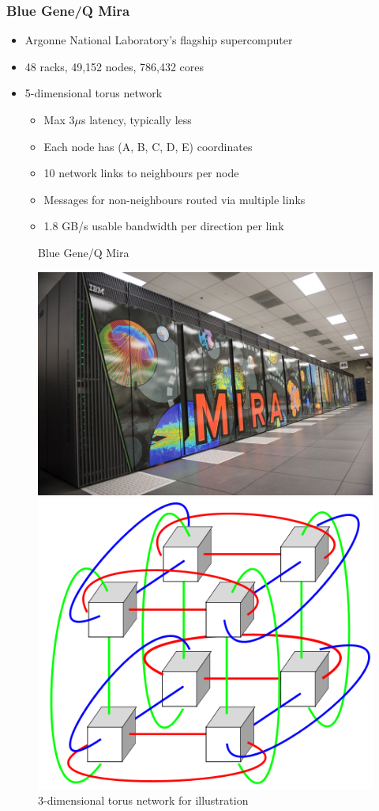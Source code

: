 \documentclass{beamer}
\begin{document}
\begin{frame}
\frametitle{Blue Gene/Q Mira}
\begin{itemize}
\item Argonne National Laboratory's flagship supercomputer
\item 48 racks, 49,152 nodes, 786,432 cores
\item 5-dimensional torus network
  \begin{itemize}
    \item Max 3$\mu$s latency, typically less
    \item Each node has (A, B, C, D, E) coordinates
    \item 10 network links to neighbours per node
    \item Messages for non-neighbours routed via multiple links
    \item 1.8 GB/s usable bandwidth per direction per link
  \end{itemize}
\end{itemize}
\vspace{-1.0em}
\centering
\begin{figure}
  \begin{minipage}{0.45\textwidth}
    \centering
    \caption{Blue Gene/Q Mira}
    \includegraphics[width=0.9\linewidth]{mira}
  \end{minipage}
  \begin{minipage}{0.45\textwidth}
    \centering
    \caption{3-dimensional torus network for illustration}
    \includegraphics[width=0.65\linewidth]{500px-2x2x2torus}
  \end{minipage}
\end{figure}
\end{frame}
\end{document}
